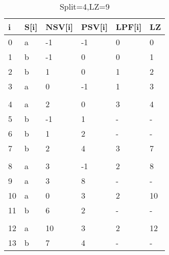 \begin{table}[h]
\begin{tabular}{@{}llllll@{}}
\toprule
i  & S{[}i{]} & NSV{[}i{]} & PSV{[}i{]} & LPF{[}i{]} & LZ \\ \midrule
0  & a        & -1         & -1         & 0          & 0  \\
1  & b        & -1         & 0          & 0          & 1  \\
2  & b        & 1          & 0          & 1          & 2  \\
3  & a        & 0          & -1         & 1          & 3  \\
   &          &            &            &            &    \\
4  & a        & 2          & 0          & 3          & 4  \\
5  & b        & -1         & 1          & -          & -  \\
6  & b        & 1          & 2          & -          & -  \\
7  & b        & 2          & 4          & 3          & 7  \\
   &          &            &            &            &    \\
8  & a        & 3          & -1         & 2          & 8  \\
9  & a        & 3          & 8          & -          & -  \\
10 & a        & 0          & 3          & 2          & 10 \\
11 & b        & 6          & 2          & -          & -  \\
   &          &            &            &            &    \\
12 & a        & 10         & 3          & 2          & 12 \\
13 & b        & 7          & 4          & -          & -  \\ \bottomrule
\end{tabular}
\caption{Split=4,LZ=9}
\label{table:example4}
\end{table}

